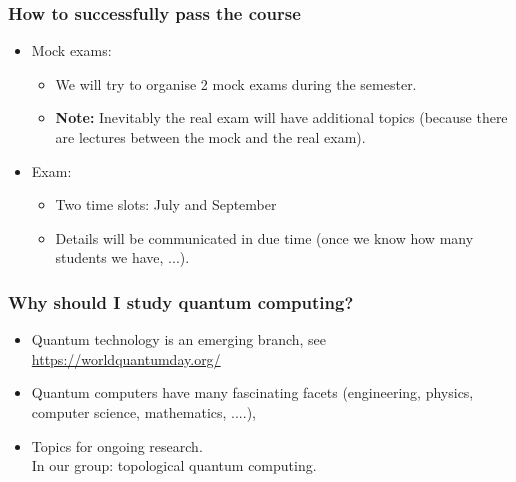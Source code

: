 \documentclass[aspectratio=169, 12pt, final, professionalfont]{beamer}
\begin{document}
  \begin{frame}\frametitle{How to successfully pass the course}
    \begin{itemize}
      \item Mock exams:
      \begin{itemize}
        \item We will try to organise 2 mock exams during the semester.
        \item \textbf{Note:} Inevitably the real exam will have additional topics (because there are lectures between the mock and the real exam).
      \end{itemize}
       \item Exam:
    \begin{itemize}
      \item Two time slots: July and September
      \item Details will be communicated in due time (once we know how many students we have, ...).
    \end{itemize}
    \end{itemize}
\end{frame}
\begin{frame}\frametitle{Why should I study quantum computing?}
  \begin{itemize}
    \item Quantum technology is an emerging branch, see \eg \url{https://worldquantumday.org/}
    \item Quantum computers have many fascinating facets (engineering, physics, computer science,  mathematics, ....),
    \item Topics for ongoing research. \\
    \phantom{Indent} In our group: topological quantum computing.
  \end{itemize}
\end{frame}
\end{document}
